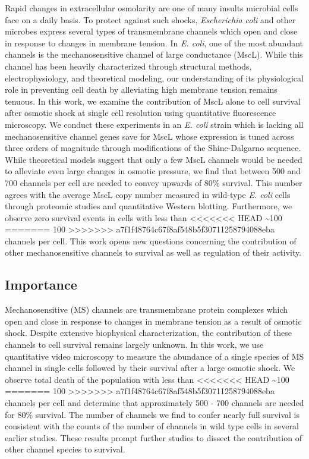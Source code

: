 Rapid
changes
in
extracellular
osmolarity
are
one of
many
insults
microbial
cells
face
on a
daily
basis.
To
protect
against
such
shocks,
\emph{Escherichia
coli}
and
other
microbes
express
several
types
of
transmembrane
channels
which
open
and
close
in
response
to
changes
in
membrane
tension.
In
\emph{E.
coli},
one of
the
most
abundant
channels
is the
mechanosensitive
channel
of
large
conductance
(MscL).
While
this
channel
has
been
heavily
characterized
through
structural
methods,
electrophysiology,
and
theoretical
modeling,
our
understanding
of its
physiological
role
in
preventing
cell
death
by
alleviating
high
membrane
tension
remains
tenuous.
In
this
work,
we
examine
the
contribution
of
MscL
alone
to
cell
survival
after
osmotic
shock
at
single
cell
resolution
using
quantitative
fluorescence
microscopy.
We
conduct
these
experiments
in an
\emph{E.
coli}
strain
which
is
lacking
all
mechanosensitive
channel
genes
save
for
MscL
whose
expression
is
tuned
across
three
orders
of
magnitude
through
modifications
of the
Shine-Dalgarno
sequence.
While
theoretical
models
suggest
that
only a
few
MscL
channels
would
be
needed
to
alleviate
even
large
changes
in
osmotic
pressure,
we
find
that
between
500
and
700
channels
per
cell
are
needed
to
convey
upwards
of
80\%
survival.
This
number
agrees
with
the
average
MscL
copy
number
measured
in
wild-type
\emph{E.
coli}
cells
through
proteomic
studies
and
quantitative
Western
blotting.
Furthermore,
we
observe
zero
survival
events
in
cells
with
less
than
<<<<<<< HEAD
\textasciitilde{}100
=======
100
>>>>>>> a7f1f48764c67f8af548b5f30711258794088eba
channels
per
cell.
This
work
opens
new
questions
concerning
the
contribution
of
other
mechanosensitive
channels
to
survival
as
well
as
regulation
of
their
activity.

\subsection{Importance}\label{importance}

Mechanosensitive
(MS)
channels
are
transmembrane
protein
complexes
which
open
and
close
in
response
to
changes
in
membrane
tension
as a
result
of
osmotic
shock.
Despite
extensive
biophysical
characterization,
the
contribution
of
these
channels
to
cell
survival
remains
largely
unknown.
In
this
work,
we use
quantitative
video
microscopy
to
measure
the
abundance
of a
single
species
of MS
channel
in
single
cells
followed
by
their
survival
after
a
large
osmotic
shock.
We
observe
total
death
of the
population
with
less
than
<<<<<<< HEAD
\textasciitilde{}100
=======
100
>>>>>>> a7f1f48764c67f8af548b5f30711258794088eba
channels
per
cell
and
determine
that
approximately
500 -
700
channels
are
needed
for
80\%
survival.
The
number
of
channels
we
find
to
confer
nearly
full
survival
is
consistent
with
the
counts
of the
number
of
channels
in
wild
type
cells
in
several
earlier
studies.
These
results
prompt
further
studies
to
dissect
the
contribution
of
other
channel
species
to
survival.

